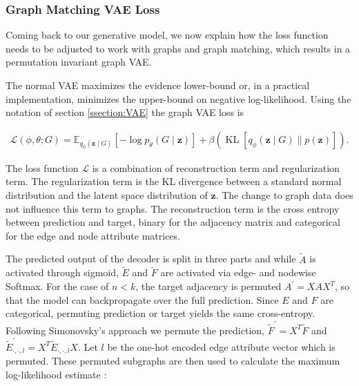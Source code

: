 {\subsubsection{Graph Matching VAE Loss}
\label{ssec3:GVAEloss}
Coming back to our generative model, we now explain how the loss function needs to be adjusted to work with graphs and graph matching, which results in a permutation invariant graph VAE.

The normal VAE maximizes the evidence lower-bound or, in a practical implementation, minimizes the upper-bound on negative log-likelihood. Using the notation of section \ref{ssection:VAE} the graph VAE loss is

\begin{equation}
    \begin{array}{l}
    \mathcal{L}(\phi, \theta ; G)=\mathbb{E}_{q_{\phi}(\mathbf{z} \mid G)}\left[-\log p_{\theta}(G \mid \mathbf{z})\right]+\beta (\operatorname{KL}\left[q_{\phi}(\mathbf{z} \mid G) \| p(\mathbf{z})\right]).
    \end{array}
\end{equation}

The loss function $\mathcal{L}$ is a combination of reconstruction term and regularization term. The regularization term is the KL divergence between a standard normal distribution and the latent space distribution of $\mathbf{z}$. The change to graph data does not influence this term  to graphs. The reconstruction term is the cross entropy between prediction and target, binary for the adjacency matrix and categorical for the edge and node attribute matrices. 



The predicted output of the decoder is split in three parts and while $\tilde{A}$ is activated through sigmoid, $\tilde{E}$ and $\tilde{F}$ are activated via edge- and nodewise Softmax. 
For the case of $n<k$, the target adjacency is permuted $A^{\prime}=X A X^{T}$, so that the model can backpropagate over the full prediction. Since $E$ and $F$ are categorical, permuting prediction or target yields the same cross-entropy. Following Simonovsky's approach \cite{simonovsky_graphvae_2018} we permute the prediction, $\widetilde{F}^{\prime}=X^{T} \widetilde{F}$ and $\widetilde{E}_{\cdot, \cdot, l}^{\prime}=X^{T} \widetilde{E}_{\cdot, \cdot, l} X$. Let $l$ be the one-hot encoded edge attribute vector which is permuted. These permuted subgraphs are then used to calculate the maximum log-likelihood estimate \cite{simonovsky_graphvae_2018}:

}
